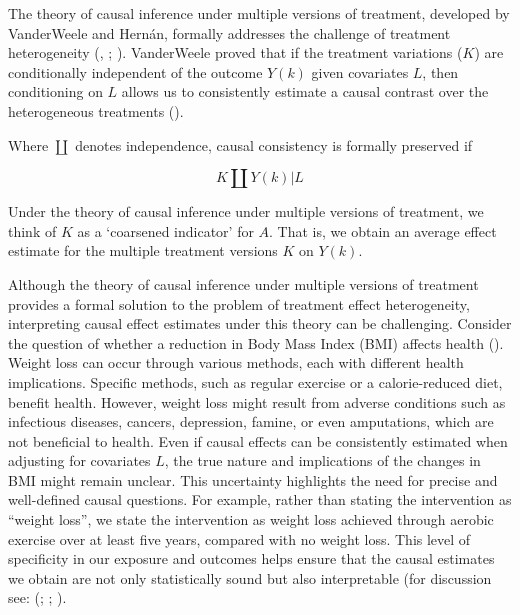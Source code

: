 \documentclass[
  singlecolumn,
  9pt]{article}
\begin{document}
The theory of causal inference under multiple versions of treatment,
developed by VanderWeele and Hernán, formally addresses the challenge of
treatment heterogeneity (, ;
).
VanderWeele proved that if the treatment variations (\(K\)) are
conditionally independent of the outcome \(Y(k)\) given covariates
\(L\), then conditioning on \(L\) allows us to consistently estimate a
causal contrast over the heterogeneous treatments
().

Where \(\coprod\) denotes independence, causal consistency is formally
preserved if

\[
K \coprod Y(k) | L
\]

Under the theory of causal inference under multiple versions of
treatment, we think of \(K\) as a `coarsened indicator' for \(A\). That
is, we obtain an average effect estimate for the multiple treatment
versions \(K\) on \(Y(k)\).

Although the theory of causal inference under multiple versions of
treatment provides a formal solution to the problem of treatment effect
heterogeneity, interpreting causal effect estimates under this theory
can be challenging. Consider the question of whether a reduction in Body
Mass Index (BMI) affects health (). Weight loss can occur through various methods, each with
different health implications. Specific methods, such as regular
exercise or a calorie-reduced diet, benefit health. However, weight loss
might result from adverse conditions such as infectious diseases,
cancers, depression, famine, or even amputations, which are not
beneficial to health. Even if causal effects can be consistently
estimated when adjusting for covariates \(L\), the true nature and
implications of the changes in BMI might remain unclear. This
uncertainty highlights the need for precise and well-defined causal
questions. For example, rather than stating the intervention as ``weight
loss'', we state the intervention as weight loss achieved through
aerobic exercise over at least five years, compared with no weight loss.
This level of specificity in our exposure and outcomes helps ensure that
the causal estimates we obtain are not only statistically sound but also
interpretable (for discussion see: (; ; ).
\end{document}
